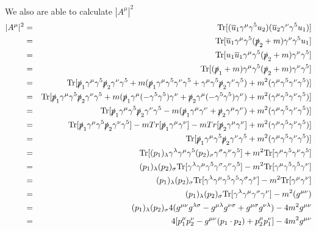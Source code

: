 \documentclass[12pt]{article}
\def \bea{\begin{eqnarray}}
\def \eea{\end{eqnarray}}
\def \Tr{{\rm Tr}}
\def \nn{\nonumber}
\def \nl{\nn \\}
\def \ou{\overline{u}}
\def \ga{\gamma}
\def \la{\lambda}
\def \si{\sigma}
\begin{document}
\begin{enumerate}
We also are able to calculate $|A^\mu|^2$
\bea
|A^{\mu}|^2 &=& \Tr[(\ou_1\ga^\mu \ga^5 u_2)(\ou_2 \ga^\nu \ga^5 u_1)] \\
&=& \Tr[\ou_1\ga^\mu \ga^5 (\slashed{p}_2+m) \ga^\nu \ga^5 u_1]  \\
&=&\Tr[u_1\ou_1\ga^\mu \ga^5 (\slashed{p}_2+m) \ga^\nu \ga^5 ]\\
&=&\Tr[(\slashed{p}_1+m)\ga^\mu \ga^5 (\slashed{p}_2+m) \ga^\nu \ga^5 ]\\
&=& \Tr[\slashed{p}_1\ga^\mu\ga^5 \slashed{p}_2\ga^\nu \ga^5 + m( \slashed{p}_1\ga^\mu\ga^5\ga^\nu \ga^5 +\ga^\mu\ga^5 \slashed{p}_2\ga^\nu \ga^5) + m^2(\ga^\mu\ga^5\ga^\nu \ga^5)] \\
&=&\Tr[\slashed{p}_1\ga^\mu\ga^5 \slashed{p}_2\ga^\nu \ga^5 + m( \slashed{p}_1\ga^\mu(-\ga^5 \ga^5)\ga^\nu +\slashed{p}_2\ga^\mu(-\ga^5\ga^5) \ga^\nu ) + m^2(\ga^\mu\ga^5\ga^\nu \ga^5)] \nl
&=&\Tr[\slashed{p}_1\ga^\mu\ga^5 \slashed{p}_2\ga^\nu \ga^5 - m( \slashed{p}_1\ga^\mu\ga^\nu +\slashed{p}_2\ga^\mu\ga^\nu ) + m^2(\ga^\mu\ga^5\ga^\nu \ga^5)] \\
&=&\Tr[\slashed{p}_1\ga^\mu\ga^5 \slashed{p}_2\ga^\nu \ga^5] -mTr[ \slashed{p}_1\ga^\mu\ga^\nu]-mTr[ \slashed{p}_2\ga^\mu\ga^\nu]+ m^2(\ga^\mu\ga^5\ga^\nu \ga^5)] \\
&=&\Tr[\slashed{p}_1\ga^\mu\ga^5 \slashed{p}_2\ga^\nu \ga^5 + m^2(\ga^\mu\ga^5\ga^\nu \ga^5)] \\
&=& \Tr[(p_1)_\la\ga^\la\ga^\mu\ga^5 (p_2)_\si\ga^\si\ga^\nu \ga^5] + m^2\Tr[\ga^\mu\ga^5\ga^\nu \ga^5]\\
&=& (p_1)_\la(p_2)_\si \Tr[\ga^\la\ga^\mu\ga^5 \ga^\si\ga^\nu \ga^5] - m^2\Tr[\ga^\mu\ga^5\ga^5 \ga^\nu]\\
&=& (p_1)_\la(p_2)_\si \Tr[\ga^\la\ga^\mu\ga^5\ga^5 \ga^\si\ga^\nu] - m^2\Tr[\ga^\mu\ga^\nu]\\
&=& (p_1)_\la(p_2)_\si \Tr[\ga^\la\ga^\mu\ga^\si\ga^\nu] - m^2(g^{\mu\nu})\\
&=& (p_1)_\la(p_2)_\si 4(g^{\mu\nu}g^{\la\si} - g^{\mu\la} g^{\nu\si} + g^{\mu\si}g^{\nu\la}) - 4m^2g^{\mu\nu}\\
&=& 4[p_1^\mu p_2^\nu - g^{\mu\nu}(p_1 \cdot p_2) + p_2^\mu p_1^\nu] - 4m^2g^{\mu\nu} 
\eea


\end{enumerate}
\end{document}
